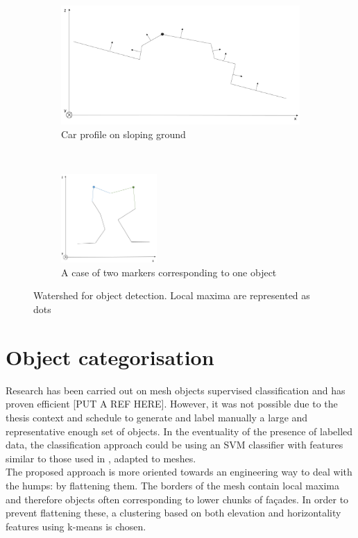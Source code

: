 \documentclass{kththesis}
\begin{document}
\begin{figure}[t!]
    \centering
    \begin{subfigure}[t]{0.5\textwidth}
        \centering
        \includegraphics[width=\textwidth]{images/angles_constraint.png}
        \caption{Car profile on sloping ground }
        \label{fig:ws_angles}
    \end{subfigure}%
    ~ 
    \begin{subfigure}[t]{0.5\textwidth}
        \centering
        \includegraphics[width=0.4\textwidth]{images/merging_markers.png}
        \caption{A case of two markers corresponding to one object}
        \label{fig:ws_merging}
    \end{subfigure}
    \caption{Watershed for object detection. Local maxima are represented as dots}
\end{figure}


\section{Object categorisation}
Research has been carried out on mesh objects supervised classification and has proven efficient [PUT A REF HERE]. However, it was not possible due to the thesis context and schedule to generate and label manually a large and representative enough set of objects. In the eventuality of the presence of labelled  data, the classification approach could be using an SVM classifier with features similar to those used in \textcite{det_seg_class}, adapted to meshes. \\ The proposed approach is more oriented towards an engineering way to deal with the humps: by flattening them. The borders of the mesh contain local maxima and therefore objects often corresponding to lower chunks of façades. In order to prevent flattening these, a clustering based on both elevation and horizontality features using k-means is chosen. 
\end{document}
